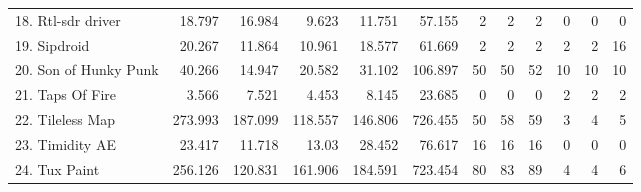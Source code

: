 \begin{table*}[t]
\begin{tabular}{l||r|r|r|r|r||r|r|r||r|r|r}
  18. Rtl-sdr driver         & 18.797                & 16.984                   & 9.623                      & 11.751                                     & 57.155                                  & 2                           & 2                            & 2                         & 0                           & 0                            & 0                          \\
  19. Sipdroid               & 20.267                & 11.864                   & 10.961                     & 18.577                                     & 61.669                                  & 2                           & 2                            & 2                         & 2                           & 2                            & 16                         \\
  20. Son of Hunky Punk      & 40.266                & 14.947                   & 20.582                     & 31.102                                     & 106.897                                 & 50                          & 50                           & 52                        & 10                          & 10                           & 10                         \\
  21. Taps Of Fire           & 3.566                 & 7.521                    & 4.453                      & 8.145                                      & 23.685                                  & 0                           & 0                            & 0                         & 2                           & 2                            & 2                          \\
  22. Tileless Map           & 273.993               & 187.099                  & 118.557                    & 146.806                                    & 726.455                                 & 50                          & 58                           & 59                        & 3                           & 4                            & 5                          \\
  23. Timidity AE            & 23.417                & 11.718                   & 13.03                      & 28.452                                     & 76.617                                  & 16                          & 16                           & 16                        & 0                           & 0                            & 0                          \\
  24. Tux Paint              & 256.126               & 120.831                  & 161.906                    & 184.591                                    & 723.454                                 & 80                          & 83                           & 89                        & 4                           & 4                            & 6                          \\

\end{tabular}
\end{table*}

